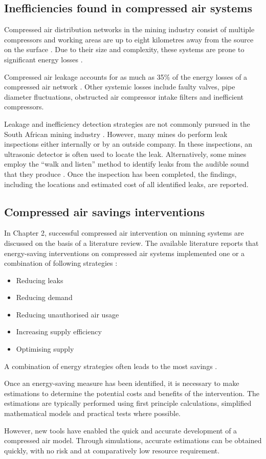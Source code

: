 	\subsection{Inefficiencies found in compressed air systems}
		Compressed air distribution networks in the mining industry consist of multiple compressors and working areas are up to eight kilometres away from the source on the surface \cite{Marais2012PhD}. Due to their size and complexity, these systems are prone to significant energy losses \cite{Marais2012PhD}.
		\par 
		Compressed air leakage accounts for as much as 35\% of the energy losses of a compressed air network \cite{Lawrence2004Improving}. Other systemic losses include faulty valves, pipe diameter fluctuations, obstructed air compressor intake filters and inefficient compressors. 	
		\par
		Leakage and inefficiency detection strategies are not commonly pursued in the South African mining industry \cite{vanTonder2010Masters}. However, many mines do perform leak inspections either internally or by an outside company. In these inspections, an ultrasonic detector is often used to locate the leak. Alternatively, some mines employ the \enquote{walk and listen} method to identify leaks from the audible sound that they produce \cite{vanTonder2010Masters}. Once the inspection has been completed, the findings, including the locations and estimated cost of all identified leaks, are reported.
		
	\subsection{Compressed air savings interventions}
		In Chapter 2, successful compressed air intervention on minning systems are discussed on the basis of a literature review. The available literature reports that energy-saving interventions on compressed air systems implemented one or a combination of following strategies \cite{Snyman2011Masters}:
		\begin{itemize}
			\item Reducing leaks
			\item Reducing demand
			\item Reducing unauthorised air usage
			\item Increasing supply efficiency
			\item Optimising supply
		\end{itemize}
	 A combination of energy strategies often leads to the most savings \cite{Marais2012PhD}. 
	 \par 
	 Once an energy-saving measure has been identified, it is necessary to make estimations to determine the potential costs and benefits of the intervention. The estimations are typically performed using first principle calculations, simplified mathematical models and practical tests where possible. 
	 \par 
	 However, new tools have enabled the quick and accurate development of a compressed air model. Through simulations, accurate estimations can be obtained quickly, with no risk and at comparatively low resource requirement.
